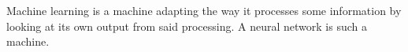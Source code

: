 Machine learning is a machine adapting the way it processes some information by looking at its own output from said processing. A neural network is such a machine.  





